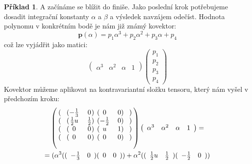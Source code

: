 \documentclass[a5paper,12pt]{amsbook}
\theoremstyle{definition}
\newtheorem{example}{Příklad}[chapter]
\newcommand{\myvec}[1]{\mathbf{#1}}
\begin{document}
\begin{example}
\medskip\noindent
A začínáme se blížit do finiše. Jako poslední krok potřebujeme dosadit integrační konstanty $\alpha$ a $\beta$
a výsledek navzájem odečíst. Hodnota polynomu v konkrétním bodě je nám již známý kovektor:
\begin{equation*}
\myvec{p}(\alpha) = p_1\alpha^3 + p_2\alpha^2 + p_3\alpha + p_4
\end{equation*}
což lze vyjádřit jako matici:
\begin{equation*}
\left(\begin{array}{cccc}\alpha^3 & \alpha^2 & \alpha & 1\end{array}\right)
\left(\begin{array}{c}p_1 \\ p_2 \\ p_3 \\ p_4 \end{array}\right)
\end{equation*}
Kovektor můžeme aplikovat na kontravariantní složku tensoru, který nám vyšel v předchozím kroku:
\begin{equation*}
\begin{split}
&\left(\begin{blockarray}{cccccc}
\begin{block}{(c(cc)(cc)c)}
& -\frac{1}{3} & 0 & 0 & 0 &\\
\end{block}
\begin{block}{(c(cc)(cc)c)}
& \frac{1}{2}u & \frac{1}{2} & -\frac{1}{2} & 0 & \\
\end{block}
\begin{block}{(c(cc)(cc)c)}
& 0 & 0 & u & 1 &\\
\end{block}
\begin{block}{(c(cc)(cc)c)}
& 0 & 0 & 0 & 0 &\\
\end{block}
\end{blockarray}\right)
\left(\begin{array}{cccc}\alpha^3 & \alpha^2 & \alpha & 1\end{array}\right)
= \\ = &
\;(
\alpha^3((\begin{array}{cc}-\frac{1}{3} & 0\end{array})(\begin{array}{cc}0 & 0\end{array}))
  + \alpha^2((\begin{array}{cc}\frac{1}{2}u & \frac{1}{2}\end{array})(\begin{array}{cc}-\frac{1}{2} & 0\end{array})) \\

\end{split}
\end{equation*}
\end{example}
\end{document}
